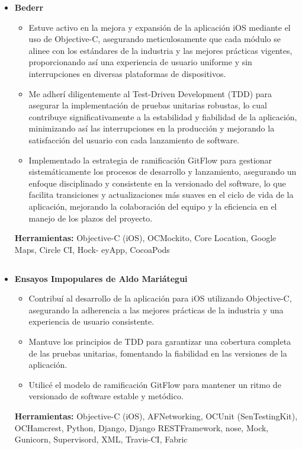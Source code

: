 \documentclass[11pt,a4paper,english]{moderncv}
\begin{document}
{
\begin{itemize}
    \item \textbf{Bederr}
        \begin{itemize}
            \item Estuve activo en la mejora y expansión de la aplicación iOS mediante el uso de Objective-C, asegurando meticulosamente que cada módulo se alinee con los estándares de la industria y las mejores prácticas vigentes, proporcionando así una experiencia de usuario uniforme y sin interrupciones en diversas plataformas de dispositivos.
            \item Me adherí diligentemente al Test-Driven Development (TDD) para asegurar la implementación de pruebas unitarias robustas, lo cual contribuye significativamente a la estabilidad y fiabilidad de la aplicación, minimizando así las interrupciones en la producción y mejorando la satisfacción del usuario con cada lanzamiento de software.
            \item Implementado la estrategia de ramificación GitFlow para gestionar sistemáticamente los procesos de desarrollo y lanzamiento, asegurando un enfoque disciplinado y consistente en la versionado del software, lo que facilita transiciones y actualizaciones más suaves en el ciclo de vida de la aplicación, mejorando la colaboración del equipo y la eficiencia en el manejo de los plazos del proyecto.
        \end{itemize}
        \textbf{Herramientas:} Objective-C (iOS), OCMockito, Core Location, Google Maps, Circle CI, Hock- eyApp, CocoaPods
\end{itemize}
}

\subsection{}

{
\begin{itemize}
    \item \textbf{Ensayos Impopulares de Aldo Mariátegui}
        \begin{itemize}
            \item Contribuí al desarrollo de la aplicación para iOS utilizando Objective-C, asegurando la adherencia a las mejores prácticas de la industria y una experiencia de usuario consistente.
            \item Mantuve los principios de TDD para garantizar una cobertura completa de las pruebas unitarias, fomentando la fiabilidad en las versiones de la aplicación.
            \item Utilicé el modelo de ramificación GitFlow para mantener un ritmo de versionado de software estable y metódico.
        \end{itemize}
        \textbf{Herramientas:} Objective-C (iOS), AFNetworking, OCUnit (SenTestingKit), OCHamcrest, Python, Django, Django RESTFramework, nose, Mock, Gunicorn, Supervisord, XML, Travis-CI, Fabric
\end{itemize}
}
\end{document}
